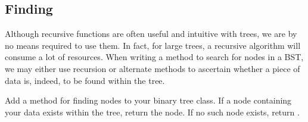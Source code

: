 \subsection*{Finding}
Although recursive functions are often useful and intuitive with trees, we  are by no means required to use them. In fact, for large trees, a recursive algorithm will consume a lot of resources. When writing a method to search for nodes in a BST, we may either use recursion or alternate methods to ascertain whether a piece of data is, indeed, to be found within the tree.

\begin{problem}
Add a method for finding nodes to your binary tree class. If a node containing your data exists within the tree, return the node. If no such node exists, return .
\label{prob:BST1}
\end{problem}


